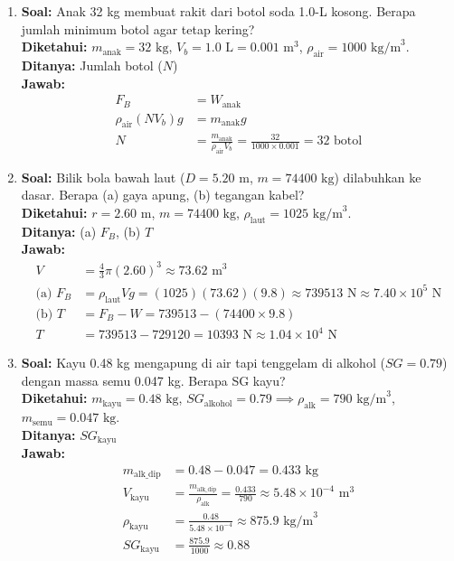 \documentclass[twocolumn]{article}
\begin{document}
\begin{enumerate}
    \item \textbf{Soal:} Anak 32 kg membuat rakit dari botol soda 1.0-L kosong. Berapa jumlah minimum botol agar tetap kering? \\
    \textbf{Diketahui:} $m_{\text{anak}} = 32 \text{ kg}$, $V_b = 1.0 \text{ L} = 0.001 \text{ m}^3$, $\rho_{\text{air}} = 1000 \text{ kg/m}^3$. \\
    \textbf{Ditanya:} Jumlah botol ($N$) \\
    \textbf{Jawab:}
    \begin{align*}
        F_B &= W_{\text{anak}} \\
        \rho_{\text{air}} (N V_b) g &= m_{\text{anak}} g \\
        N &= \frac{m_{\text{anak}}}{\rho_{\text{air}} V_b} = \frac{32}{1000 \times 0.001} = 32 \text{ botol}
    \end{align*}

    \item \textbf{Soal:} Bilik bola bawah laut ($D = 5.20 \text{ m}$, $m = 74400 \text{ kg}$) dilabuhkan ke dasar. Berapa (a) gaya apung, (b) tegangan kabel? \\
    \textbf{Diketahui:} $r = 2.60 \text{ m}$, $m = 74400 \text{ kg}$, $\rho_{\text{laut}} = 1025 \text{ kg/m}^3$. \\
    \textbf{Ditanya:} (a) $F_B$, (b) $T$ \\
    \textbf{Jawab:}
    \begin{align*}
        V &= \frac{4}{3} \pi (2.60)^3 \approx 73.62 \text{ m}^3 \\
        \text{(a) } F_B &= \rho_{\text{laut}} V g = (1025)(73.62)(9.8) \approx 739513 \text{ N} \approx 7.40 \times 10^5 \text{ N} \\
        \text{(b) } T &= F_B - W = 739513 - (74400 \times 9.8) \\
        T &= 739513 - 729120 = 10393 \text{ N} \approx 1.04 \times 10^4 \text{ N}
    \end{align*}

    \item \textbf{Soal:} Kayu 0.48 kg mengapung di air tapi tenggelam di alkohol ($SG = 0.79$) dengan massa semu 0.047 kg. Berapa SG kayu? \\
    \textbf{Diketahui:} $m_{\text{kayu}} = 0.48 \text{ kg}$, $SG_{\text{alkohol}} = 0.79 \implies \rho_{\text{alk}} = 790 \text{ kg/m}^3$, $m_{\text{semu}} = 0.047 \text{ kg}$. \\
    \textbf{Ditanya:} $SG_{\text{kayu}}$ \\
    \textbf{Jawab:}
    \begin{align*}
        m_{\text{alk\_dip}} &= 0.48 - 0.047 = 0.433 \text{ kg} \\
        V_{\text{kayu}} &= \frac{m_{\text{alk\_dip}}}{\rho_{\text{alk}}} = \frac{0.433}{790} \approx 5.48 \times 10^{-4} \text{ m}^3 \\
        \rho_{\text{kayu}} &= \frac{0.48}{5.48 \times 10^{-4}} \approx 875.9 \text{ kg/m}^3 \\
        SG_{\text{kayu}} &= \frac{875.9}{1000} \approx 0.88
    \end{align*}


\end{enumerate}
\end{document}
